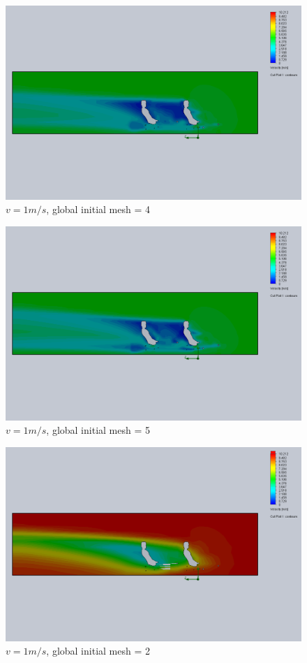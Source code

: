 \documentclass[11pt]{article}
\begin{document}
\begin{figure}
\includegraphics[width=\textwidth]{gm_4_rf_7_v05.png}
\caption{$v = 1 m/s$, global initial mesh = 4}
\end{figure}

\begin{figure}
\includegraphics[width=\textwidth]{gm_5_rf_7_v05.png}
\caption{$v = 1 m/s$, global initial mesh = 5}
\end{figure}

\begin{figure}
\includegraphics[width=\textwidth]{gm_2_rf_7_v10.png}
\caption{$v = 1 m/s$, global initial mesh = 2}
\end{figure}
\end{document}
